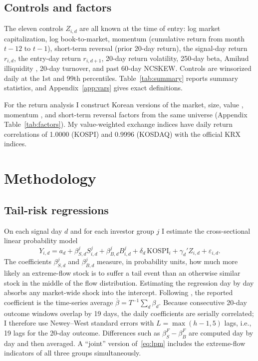 \documentclass[11pt]{article}
\begin{document}
\subsection{Controls and factors}
The eleven controls $Z_{i,d}$ are all known at the time of entry: log market capitalization, log book-to-market,
momentum (cumulative return from month $t-12$ to $t-1$), short-term reversal (prior 20-day return), the signal-day
return $r_{i,d}$, the entry-day return $r_{i,d+1}$, 20-day return volatility, 250-day beta, Amihud illiquidity
\citep{amihud2002}, 20-day turnover, and past 60-day NCSKEW. Controls are winsorized daily at the 1st and 99th
percentiles. Table~\ref{tab:summary} reports summary statistics, and Appendix~\ref{app:vars} gives exact definitions.

For the return analysis I construct Korean versions of the market, size, value \citep{fama1993}, momentum
\citep{carhart1997}, and short-term reversal \citep{jegadeesh1990} factors from the same universe
(Appendix Table~\ref{tab:factors}). My value-weighted exchange indices have daily return correlations of 1.0000 (KOSPI)
and 0.9996 (KOSDAQ) with the official KRX indices.



\section{Methodology}\label{sec:method}

\subsection{Tail-risk regressions}
On each signal day $d$ and for each investor group $j$ I estimate the cross-sectional linear probability model
\begin{equation}\label{eq:lpm}
Y_{i,d}=a_d+\beta^j_{S,d}S^j_{i,d}+\beta^j_{B,d}B^j_{i,d}+\delta_d\,\mathrm{KOSPI}_i+\gamma_d'Z_{i,d}+\varepsilon_{i,d}.
\end{equation}
The coefficients $\beta^j_{S,d}$ and $\beta^j_{B,d}$ measure, in probability units, how much more likely an extreme-flow
stock is to suffer a tail event than an otherwise similar stock in the middle of the flow distribution. Estimating the
regression day by day absorbs any market-wide shock into the intercept. Following \citet{fama1973}, the reported
coefficient is the time-series average $\bar\beta=T^{-1}\sum_d\beta_d$. Because consecutive 20-day outcome windows
overlap by 19 days, the daily coefficients are serially correlated; I therefore use Newey--West standard errors
\citep{newey1987} with $L=\max(h-1,5)$ lags, i.e., 19 lags for the 20-day outcome. Differences such as
$\beta^F_S-\beta^F_B$ are computed day by day and then averaged. A ``joint'' version of~\eqref{eq:lpm} includes the
extreme-flow indicators of all three groups simultaneously.
\end{document}

